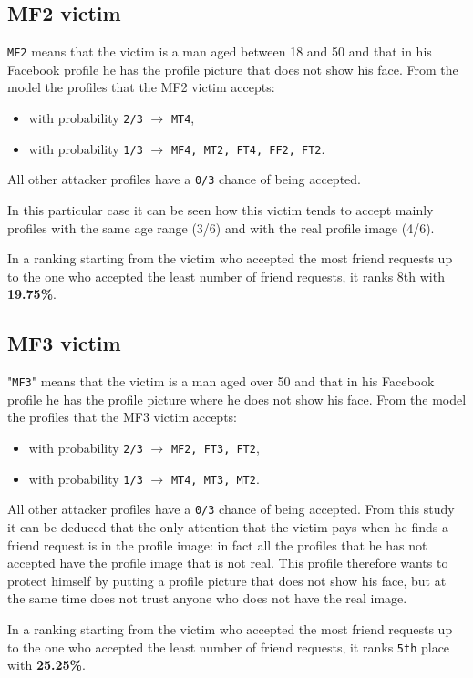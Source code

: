 \subsection*{MF2 victim}
\texttt{MF2} means that the victim is a man aged between 18 and 50 and that in his Facebook profile he has the profile picture that does not show his face.
From the model the profiles that the MF2 victim accepts:
\begin{itemize}
	\item with probability \texttt{2/3} $\rightarrow$ \texttt{MT4},
	\item with probability \texttt{1/3} $\rightarrow$ \texttt{MF4, MT2, FT4, FF2, FT2}.
\end{itemize}  
All other attacker profiles have a \texttt{0/3} chance of being accepted.
\par \noindent In this particular case it can be seen how this victim tends to accept mainly profiles with the same age range (3/6) and with the real profile image (4/6).
\par \noindent In a ranking starting from the victim who accepted the most friend requests up to the one who accepted the least number of friend requests, it ranks 8th with \textbf{19.75\%}.


\subsection*{MF3 victim}
"\texttt{MF3}" means that the victim is a man aged over 50 and that in his Facebook profile he has the profile picture where he does not show his face.
From the model the profiles that the MF3 victim accepts:
\begin{itemize}
	\item with probability \texttt{2/3} $\rightarrow$ \texttt{MF2, FT3, FT2},
	\item with probability \texttt{1/3} $\rightarrow$ \texttt{MT4, MT3, MT2}.
\end{itemize}  
All other attacker profiles have a \texttt{0/3} chance of being accepted.
From this study it can be deduced that the only attention that the victim pays when he finds a friend request is in the profile image: in fact all the profiles that he has not accepted have the profile image that is not real. This profile therefore wants to protect himself by putting a profile picture that does not show his face, but at the same time does not trust anyone who does not have the real image.
\par \noindent In a ranking starting from the victim who accepted the most friend requests up to the one who accepted the least number of friend requests, it ranks \texttt{5th} place with \textbf{25.25\%}.


